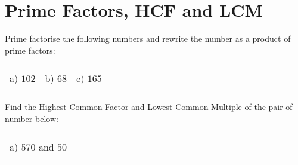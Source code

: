 \documentclass[12pt]{article}
\begin{document}
\section{Prime Factors, HCF and LCM}
Prime factorise the following numbers and rewrite the number as a product of prime factors:
\begin{table}[h!]
\centering
\begin{tabular}{c c c}
\hspace{4cm} & \hspace{4cm} & \hspace{4cm} \\
a) $102$ & b) $68$ & c) $165$\\ \\
\end{tabular}
\end{table}
\newline
Find the Highest Common Factor and Lowest Common Multiple of the pair of number below:
\begin{table}[h!]
\centering
\begin{tabular}{c}
\hspace{4cm}\\
a) $570$ and $50$\\ \\
\end{tabular}
\end{table}
\newline
\end{document}
